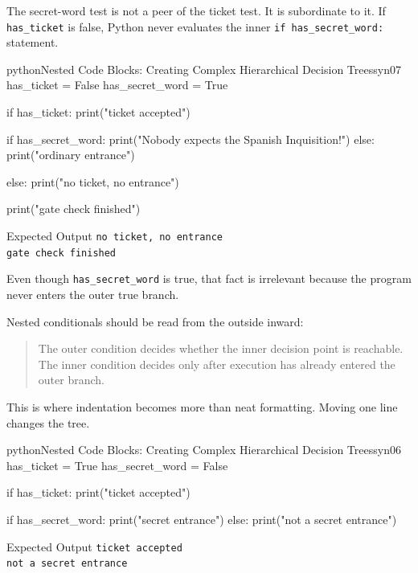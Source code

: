 The secret-word test is not a peer of the ticket test. It is subordinate to it. If \texttt{has\_ticket} is false, Python never evaluates the inner \texttt{if has\_secret\_word:} statement.

\begin{codebox}[]{python}{Nested Code Blocks: Creating Complex Hierarchical Decision Trees}{syn07}
has_ticket = False
has_secret_word = True

if has_ticket:
    print("ticket accepted")

    if has_secret_word:
        print("Nobody expects the Spanish Inquisition!")
    else:
        print("ordinary entrance")

else:
    print("no ticket, no entrance")

print("gate check finished")
\end{codebox}


\begin{iobox}{Expected Output}
\texttt{no ticket, no entrance} \\
\texttt{gate check finished} \\
\end{iobox}


Even though \texttt{has\_secret\_word} is true, that fact is irrelevant because the program never enters the outer true branch.

Nested conditionals should be read from the outside inward:

\begin{quote}
The outer condition decides whether the inner decision point is reachable. The inner condition decides only after execution has already entered the outer branch.
\end{quote}

This is where indentation becomes more than neat formatting. Moving one line changes the tree.

\begin{codebox}[]{python}{Nested Code Blocks: Creating Complex Hierarchical Decision Trees}{syn06}
has_ticket = True
has_secret_word = False

if has_ticket:
    print("ticket accepted")

if has_secret_word:
    print("secret entrance")
else:
    print("not a secret entrance")
\end{codebox}


\begin{iobox}{Expected Output}
\texttt{ticket accepted} \\
\texttt{not a secret entrance} \\
\end{iobox}


